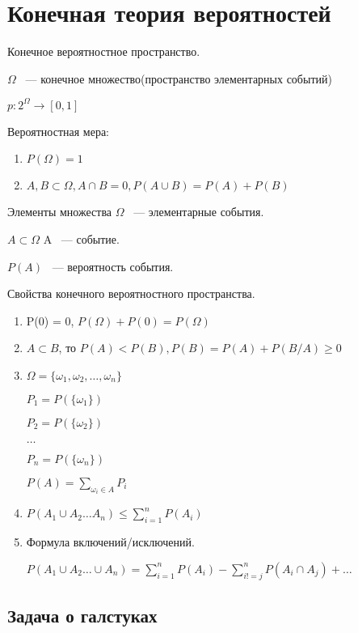 \documentclass[12pt]{article}
\begin{document}
\section{Конечная теория вероятностей}

Конечное вероятностное пространство. 

$\Omega$ ~--- конечное множество(пространство элементарных событий)

$p: 2^{\Omega} \to [0, 1]$

Вероятностная мера:
\begin{enumerate}
\item $P(\Omega) = 1$
\item $A, B \subset \Omega, A \cap B = 0, P(A \cup B) = P(A) + P(B)$
\end{enumerate}

Элементы множества $\Omega$ ~--- элементарные события.

$A \subset \Omega$ A ~--- событие.

$P(A)$ ~--- вероятность события.

Свойства конечного вероятностного пространства. 
\begin{enumerate}
\item P(0) = 0, $P(\Omega) + P(0) = P(\Omega)$
\item $A \subset B$, то $P(A) < P(B), P(B) = P(A) + P(B/A) \ge 0$
\item $\Omega = \{\omega_1, \omega_2, \ldots, \omega_n\}$

$P_1 = P(\{\omega_1\})$

$P_2 = P(\{\omega_2\})$

$\ldots$

$P_n = P(\{\omega_n\})$

$P(A) = \sum_{\omega_i \in A} P_i$

\item $P(A_1 \cup A_2 \ldots A_n) \le \sum_{i = 1}^{n} P(A_i)$
\item Формула включений/исключений.

$P(A_1 \cup A_2 \ldots \cup A_n) = \sum_{i =1}^{n}P(A_i)  - \sum_{i != j}^{n} P(A_i \cap A_j) + \ldots$

\end{enumerate}


 
\subsection{Задача о галстуках}
\end{document}
